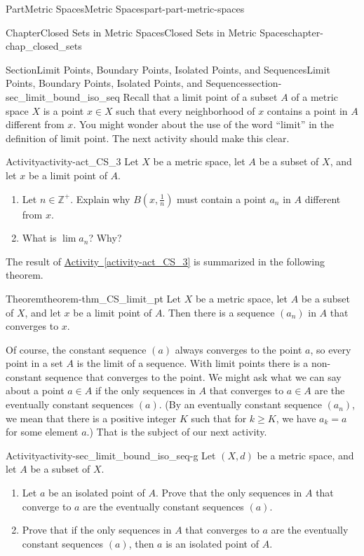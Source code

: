 \documentclass[oneside,10pt,]{book}
\newcommand{\xreffont}{\relax}
\numberwithin{equation}{chapter}
\newcommand{\Z}{\mathbb{Z}}
\begin{document}
\begin{partptx}{Part}{Metric Spaces}{}{Metric Spaces}{}{}{part-part-metric-spaces}
\begin{chapterptx}{Chapter}{Closed Sets in Metric Spaces}{}{Closed Sets in Metric Spaces}{}{}{chapter-chap_closed_sets}
\begin{sectionptx}{Section}{Limit Points, Boundary Points, Isolated Points, and Sequences}{}{Limit Points, Boundary Points, Isolated Points, and Sequences}{}{}{section-sec_limit_bound_iso_seq}
Recall that a limit point of a subset \(A\) of a metric space \(X\) is a point \(x \in X\) such that every neighborhood of \(x\) contains a point in \(A\) different from \(x\). You might wonder about the use of the word ``limit'' in the definition of limit point. The next activity should make this clear.%
\begin{activity}{Activity}{}{activity-act_CS_3}%
Let \(X\) be a metric space, let \(A\) be a subset of \(X\), and let \(x\) be a limit point of \(A\).%
\begin{enumerate}[font=\bfseries,label=(\alph*),ref=\alph*]%
\item{}Let \(n \in \Z^+\). Explain why \(B\left(x, \frac{1}{n}\right)\) must contain a point \(a_n\) in \(A\) different from \(x\).%
\item{}What is \(\lim a_n\)? Why?%
\end{enumerate}%
\end{activity}%
The result of \hyperref[activity-act_CS_3]{Activity~{\xreffont\ref{activity-act_CS_3}}} is summarized in the following theorem.%
\begin{theorem}{Theorem}{}{}{theorem-thm_CS_limit_pt}%
Let \(X\) be a metric space, let \(A\) be a subset of \(X\), and let \(x\) be a limit point of \(A\). Then there is a sequence \((a_n)\) in \(A\) that converges to \(x\).%
\end{theorem}
Of course, the constant sequence \((a)\) always converges to the point \(a\), so every point in a set \(A\) is the limit of a sequence. With limit points there is a non-constant sequence that converges to the point. We might ask what we can say about a point \(a \in A\) if the only sequences in \(A\) that converges to \(a \in A\) are the eventually constant sequences \((a)\). (By an eventually constant sequence \((a_n)\), we mean that there is a positive integer \(K\) such that for \(k \geq K\), we have \(a_k = a\) for some element \(a\).) That is the subject of our next activity.%
\begin{activity}{Activity}{}{activity-sec_limit_bound_iso_seq-g}%
Let \((X,d)\) be a metric space, and let \(A\) be a subset of \(X\).%
\begin{enumerate}[font=\bfseries,label=(\alph*),ref=\alph*]%
\item{}Let \(a\) be an isolated point of \(A\). Prove that the only sequences in \(A\) that converge to \(a\) are the eventually constant sequences \((a)\).%
\item{}Prove that if the only sequences in \(A\) that converges to \(a\) are the eventually constant sequences \((a)\), then \(a\) is an isolated point of \(A\).%

\end{enumerate}
\end{activity}
\end{sectionptx}
\end{chapterptx}
\end{partptx}
\end{document}
